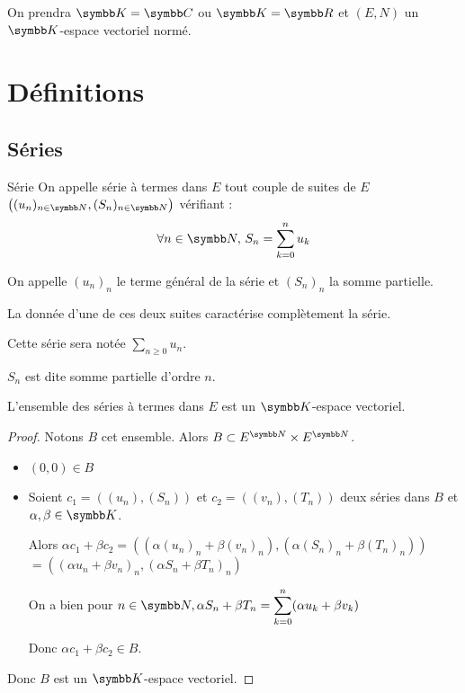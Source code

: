 On prendra $\K = \C$ ou $\K = \R$ et $(E,N)$ un $\K$-espace vectoriel normé.

\section{Définitions}
\subsection{Séries}

\begin{definition}{Série}{}
    On appelle série à termes dans $E$ tout couple de suites de $E$ $\left( (u_n)_{n\in\N}, (S_n)_{n\in\N} \right)$ vérifiant :
    \[\forall n \in \N, \, S_n = \sum_{k=0}^n u_k\]

    On appelle $(u_n)_n$ le terme général de la série et $(S_n)_n$ la somme partielle.

    La donnée d'une de ces deux suites caractérise complètement la série. 

    Cette série sera notée $\sum_{n \geqslant 0} u_n$.
\end{definition}

\begin{remarque}
    $S_n$ est dite somme partielle d'ordre $n$.  
\end{remarque}

\begin{proposition}{}{}
    L'ensemble des séries à termes dans $E$ est un $\K$-espace vectoriel.
\end{proposition}

\begin{proof}
    Notons $B$ cet ensemble. Alors $B \subset E^{\N} \times E^{\N}$.
    \begin{itemize}
        \item  $(0, 0) \in B$

        \item Soient $c_1 = \left( (u_n), (S_n) \right)$ et $c_2 = \left( (v_n), (T_n) \right)$ 
        deux séries dans $B$ et $\alpha, \beta \in \K$. 

        Alors $\alpha c_1 + \beta c_2 = \left( (\alpha(u_n)_n + \beta(v_n)_n), (\alpha(S_n)_n + \beta(T_n)_n) \right)$
        $ = \left( (\alpha u_n + \beta v_n)_n, (\alpha S_n + \beta T_n)_n \right)$

        On a bien pour $\ds n \in \N, \alpha S_n + \beta T_n = \sum_{k=0}^n (\alpha u_k + \beta v_k)$

        Donc $\alpha c_1 + \beta c_2 \in B$.
    \end{itemize}

Donc $B$ est un $\K$-espace vectoriel.
\end{proof}

